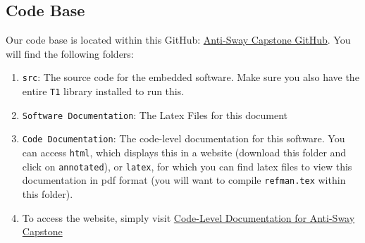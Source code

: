 \documentclass[letterpaper]{article}
\begin{document}
\subsection{Code Base}
Our code base is located within this GitHub: \hyperlink{https://github.com/me8927/Capstone-Stuff}{Anti-Sway Capstone GitHub}. You will find the following folders:
\begin{enumerate}
    \item \texttt{src}: The source code for the embedded software. Make sure you also have the entire \texttt{T1} library installed to run this.
    \item \texttt{Software Documentation}: The Latex Files for this document
    \item \texttt{Code Documentation}: The code-level documentation for this software. You can access \texttt{html}, which displays this in a website (download this folder and click on \texttt{annotated}), or \texttt{latex}, for which you can find latex files to view this documentation in pdf format (you will want to compile \texttt{refman.tex} within this folder).
    \item To access the website, simply visit \hyperlink{https://nguy8tri.github.io/Anti-Sway-Capstone/index.html}{Code-Level Documentation for Anti-Sway Capstone}
\end{enumerate}
\end{document}
